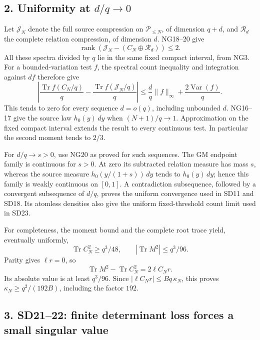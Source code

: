 \documentclass{article}
\begin{document}
\subsection{\texorpdfstring{2. Uniformity at \(d/q\to0\)}{2. Uniformity at d/q\textbackslash to0}}\label{uniformity-at-dqto0}

Let \(\mathcal J_N\) denote the full source compression on \(\mathcal P_{\le N}\), of dimension \(q+d\), and \(\mathcal R_d\) the complete relation compression, of dimension \(d\). NG18--20 give \[
\operatorname{rank}\!\left(\mathcal J_N-
          (C_N\oplus\mathcal R_d)\right)\le2.
\] All these spectra divided by \(q\) lie in the same fixed compact interval, from NG3. For a bounded-variation test \(f\), the spectral count inequality and integration against \(df\) therefore give \[
\left|\frac{\operatorname{Tr}f(C_N/q)}q
       -\frac{\operatorname{Tr}f(\mathcal J_N/q)}q\right|
\le \frac d q\|f\|_\infty+\frac{2\operatorname{Var}(f)}q.
\] This tends to zero for every sequence \(d=o(q)\), including unbounded \(d\). NG16--17 give the source law \(h_0(y)\,dy\) when \((N+1)/q\to1\). Approximation on the fixed compact interval extends the result to every continuous test. In particular the second moment tends to \(2/3\).

For \(d/q\to s>0\), use NG20 as proved for such sequences. The GM endpoint family is continuous for \(s>0\). At zero its subtracted relation measure has mass \(s\), whereas the source measure \(h_0(y/(1+s))\,dy\) tends to \(h_0(y)\,dy\); hence this family is weakly continuous on \([0,1]\). A contradiction subsequence, followed by a convergent subsequence of \(d/q\), proves the uniform convergence used in SD11 and SD18. Its atomless densities also give the uniform fixed-threshold count limit used in SD23.

For completeness, the moment bound and the complete root trace yield, eventually uniformly, \[
\operatorname{Tr}C_N^2\ge q^3/48,\qquad
|\operatorname{Tr}M^2|\le q^3/96.
\] Parity gives \(\ell r=0\), so \[
\operatorname{Tr}M^2-\operatorname{Tr}C_N^2=2\ell C_Nr.
\] Its absolute value is at least \(q^3/96\). Since \(|\ell C_Nr|\le Bq\,\kappa_N\), this proves \(\kappa_N\ge q^2/(192B)\), including the factor \(192\).

\subsection{3. SD21--22: finite determinant loss forces a small singular value}\label{sd2122-finite-determinant-loss-forces-a-small-singular-value}
\end{document}
